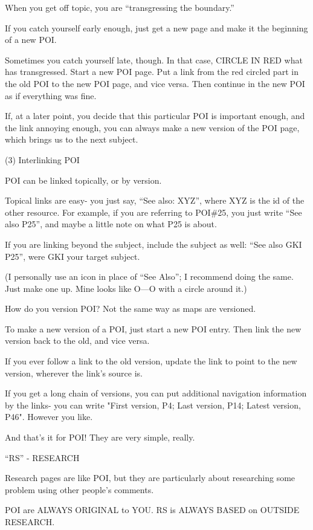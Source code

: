 \documentclass[oneside]{book}
\begin{document}
When you get off topic, you are ``transgressing the boundary.''

If you catch yourself early enough, just get a new page and make it
the beginning of a new POI.

Sometimes you catch yourself late, though. In that case, CIRCLE IN RED
what has transgressed. Start a new POI page. Put a link from the red
circled part in the old POI to the new POI page, and vice versa. Then
continue in the new POI as if everything was fine.

If, at a later point, you decide that this particular POI is important
enough, and the link annoying enough, you can always make a new
version of the POI page, which brings us to the next subject.

(3) Interlinking POI

POI can be linked topically, or by version.

Topical links are easy- you just say, ``See also: XYZ'', where XYZ is
the id of the other resource. For example, if you are referring to
POI\#25, you just write ``See also P25'', and maybe a little note on what
P25 is about.

If you are linking beyond the subject, include the subject as well:
``See also GKI P25'', were GKI your target subject.

(I personally use an icon in place of ``See Also''; I recommend doing
the same. Just make one up. Mine looks like O---O with a circle
around it.)

How do you version POI? Not the same way as maps are versioned.

To make a new version of a POI, just start a new POI entry. Then link
the new version back to the old, and vice versa.

If you ever follow a link to the old version, update the link to point
to the new version, wherever the link's source is.

If you get a long chain of versions, you can put additional navigation
information by the links- you can write "First version, P4; Last
version, P14; Latest version, P46". However you like.

And that's it for POI! They are very simple, really.

``RS'' - RESEARCH

Research pages are like POI, but they are particularly about
researching some problem using other people's comments.

POI are ALWAYS ORIGINAL to YOU.
RS is ALWAYS BASED on OUTSIDE RESEARCH.
\end{document}
